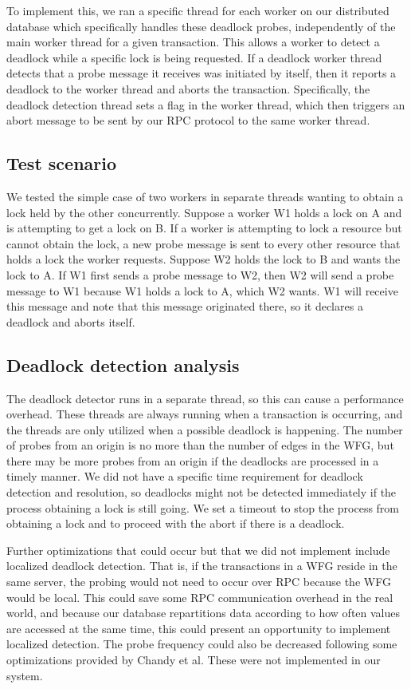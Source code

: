 \documentclass[a4paper, 10pt, notitlepage]{report}
\begin{document}
To implement this, we ran a specific thread for each worker on our distributed database which specifically handles these deadlock probes, independently of the main worker thread for a given transaction. This allows a worker to detect a deadlock while a specific lock is being requested. If a deadlock worker thread detects that a probe message it receives was initiated by itself, then it reports a deadlock to the worker thread and aborts the transaction. Specifically, the deadlock detection thread sets a flag in the worker thread, which then triggers an abort message to be sent by our RPC protocol to the same worker thread.

\subsection*{Test scenario}

We tested the simple case of two workers in separate threads wanting to obtain a lock held by the other concurrently. Suppose a worker W1 holds a lock on A and is attempting to get a lock on B. If a worker is attempting to lock a resource but cannot obtain the lock, a new probe message is sent to every other resource that holds a lock the worker requests. Suppose W2 holds the lock to B and wants the lock to A. If W1 first sends a probe message to W2, then W2 will send a probe message to W1 because W1 holds a lock to A, which W2 wants. W1 will receive this message and note that this message originated there, so it declares a deadlock and aborts itself.

\subsection*{Deadlock detection analysis}
The deadlock detector runs in a separate thread, so this can cause a performance overhead. These threads are always running when a transaction is occurring, and the threads are only utilized when a possible deadlock is happening. The number of probes from an origin is no more than the number of edges in the WFG, but there may be more probes from an origin if the deadlocks are processed in a timely manner. We did not have a specific time requirement for deadlock detection and resolution, so deadlocks might not be detected immediately if the process obtaining a lock is still going. We set a timeout to stop the process from obtaining a lock and to proceed with the abort if there is a deadlock.

Further optimizations that could occur but that we did not implement include localized deadlock detection. That is, if the transactions in a WFG reside in the same server, the probing would not need to occur over RPC because the WFG would be local. This could save some RPC communication overhead in the real world, and because our database repartitions data according to how often values are accessed at the same time, this could present an opportunity to implement localized detection. The probe frequency could also be decreased following some optimizations provided by Chandy et al. These were not implemented in our system.
\end{document}
